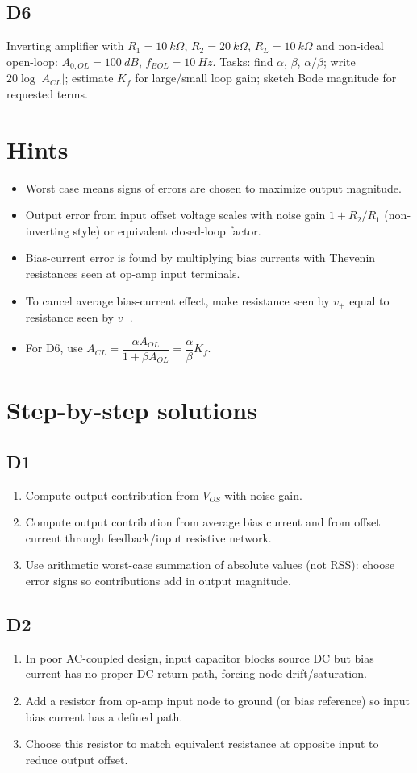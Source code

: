 \documentclass[12pt,a4paper]{article}
\begin{document}
\subsection{D6}
Inverting amplifier with $R_1=\SI{10}{k\Omega}$, $R_2=\SI{20}{k\Omega}$, $R_L=\SI{10}{k\Omega}$ and non-ideal open-loop:
$A_{0,OL}=\SI{100}{dB}$, $f_{BOL}=\SI{10}{Hz}$.
Tasks: find $\alpha$, $\beta$, $\alpha/\beta$; write $20\log|A_{CL}|$; estimate $K_f$ for large/small loop gain; sketch Bode magnitude for requested terms.

\section{Hints}
\begin{itemize}
\item Worst case means signs of errors are chosen to maximize output magnitude.
\item Output error from input offset voltage scales with noise gain $1+R_2/R_1$ (non-inverting style) or equivalent closed-loop factor.
\item Bias-current error is found by multiplying bias currents with Thevenin resistances seen at op-amp input terminals.
\item To cancel average bias-current effect, make resistance seen by $v_+$ equal to resistance seen by $v_-$.
\item For D6, use $A_{CL}=\dfrac{\alpha A_{OL}}{1+\beta A_{OL}}=\dfrac{\alpha}{\beta}K_f$.
\end{itemize}

\section{Step-by-step solutions}
\subsection{D1}
\begin{enumerate}
\item Compute output contribution from $V_{OS}$ with noise gain.
\item Compute output contribution from average bias current and from offset current through feedback/input resistive network.
\item Use arithmetic worst-case summation of absolute values (not RSS): choose error signs so contributions add in output magnitude.
\end{enumerate}

\subsection{D2}
\begin{enumerate}
\item In poor AC-coupled design, input capacitor blocks source DC but bias current has no proper DC return path, forcing node drift/saturation.
\item Add a resistor from op-amp input node to ground (or bias reference) so input bias current has a defined path.
\item Choose this resistor to match equivalent resistance at opposite input to reduce output offset.
\end{enumerate}
\end{document}
